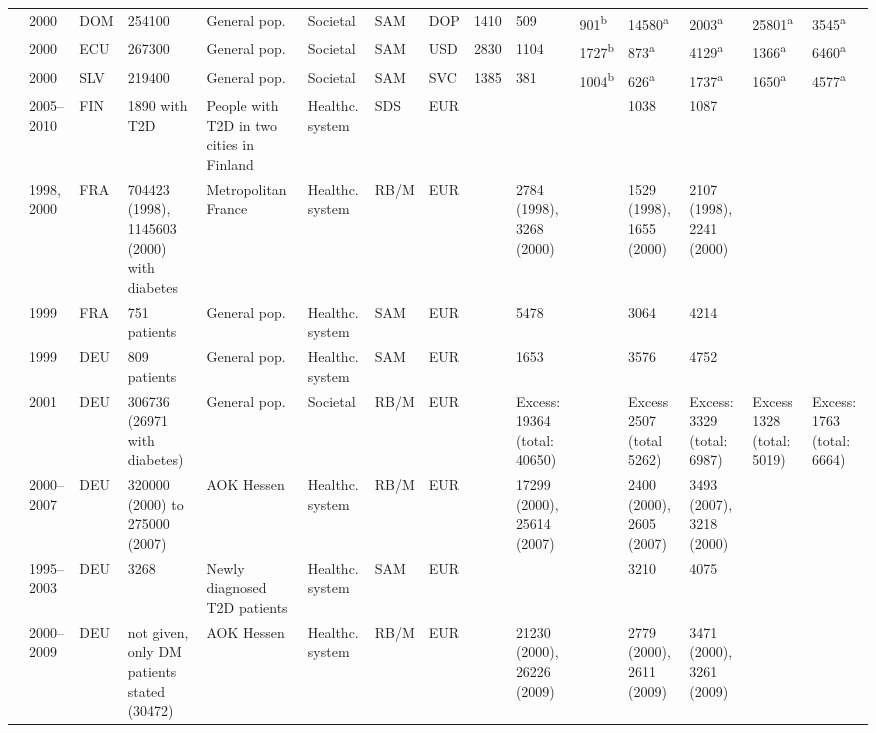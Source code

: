 \documentclass[12pt,english]{article}
\begin{document}
\begin{appendix}
\begin{landscape}
\begin{tabularx}{\linewidth}{Z X X Z Z X X X X X X X X Y Y}
\textcite{Barcelo2003} & 2000 & DOM & 254100 & General pop. & Societal & SAM & DOP & 1410 & 509 & 901\textsuperscript{b} & 14580\textsuperscript{a} & 2003\textsuperscript{a} & 25801\textsuperscript{a} & 3545\textsuperscript{a} \\
\textcite{Barcelo2003} & 2000 & ECU & 267300 & General pop. & Societal & SAM & USD & 2830 & 1104 & 1727\textsuperscript{b} & 873\textsuperscript{a} & 4129\textsuperscript{a} & 1366\textsuperscript{a} & 6460\textsuperscript{a} \\
\textcite{Barcelo2003} & 2000 & SLV & 219400 & General pop. & Societal & SAM & SVC & 1385 & 381 & 1004\textsuperscript{b} & 626\textsuperscript{a} & 1737\textsuperscript{a} & 1650\textsuperscript{a} & 4577\textsuperscript{a} \\
\textcite{Honkasalo2014} & 2005--2010 & FIN & 1890 with T2D & People with T2D in two cities in Finland & Healthc. system & SDS & EUR &  &  &  & 1038 & 1087 &  &  \\
\textcite{Ricordeau2003} & 1998, 2000 & FRA & 704423 (1998), 1145603 (2000) with diabetes & Metropolitan France & Healthc. system & RB/M & EUR &  & 2784 (1998), 3268 (2000) &  & 1529    (1998), 1655 (2000) & 2107 (1998), 2241 (2000) &  &  \\
\textcite{Jonsson2002b} & 1999 & FRA & 751 patients & General pop. & Healthc. system & SAM & EUR &  & 5478 &  & 3064 & 4214 &  &  \\
\textcite{Jonsson2002b} & 1999 & DEU & 809 patients & General pop. & Healthc. system & SAM & EUR &  & 1653 &  & 3576 & 4752 &  &  \\
\textcite{Koster2006c} & 2001 & DEU & 306736 (26971 with diabetes) & General pop. & Societal & RB/M & EUR &  & Excess: 19364  (total: 40650) &  & Excess 2507 (total 5262) & Excess: 3329 (total: 6987) & Excess 1328 (total: 5019) & Excess: 1763 (total: 6664) \\
\textcite{Koster2011c} & 2000--2007 & DEU & 320000 (2000) to 275000 (2007) & AOK Hessen & Healthc. system & RB/M & EUR &  & 17299 (2000),   25614 (2007) &  & 2400 (2000),   2605 (2007) & 3493 (2007), 3218 (2000) &  &  \\
\textcite{Martin2007b} & 1995--2003 & DEU & 3268 & Newly diagnosed T2D patients & Healthc. system & SAM & EUR &  &  &  & 3210 & 4075 &  &  \\
\textcite{Koster2012} & 2000--2009 & DEU & not given, only DM patients stated (30472) & AOK Hessen & Healthc. system & RB/M & EUR &  & 21230 (2000), 26226 (2009) &  & 2779 (2000), 2611 (2009) & 3471 (2000), 3261 (2009) &  &  \\

\end{tabularx}
\end{landscape}
\end{appendix}
\end{document}
